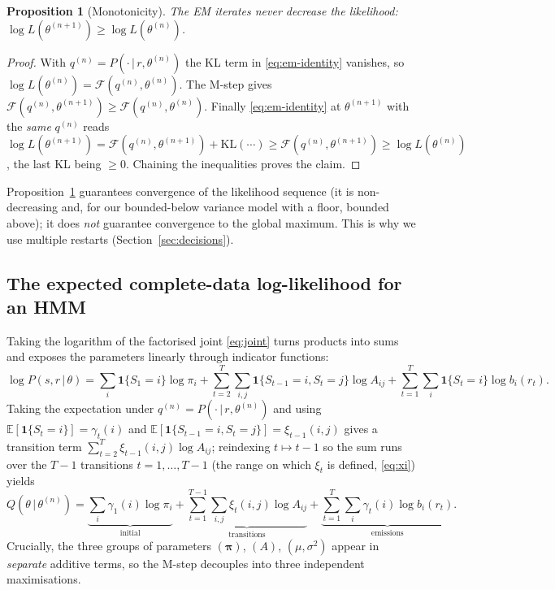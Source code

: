 \documentclass[11pt]{article}
\newcommand{\E}{\mathbb{E}}
\newcommand{\KL}{\mathrm{KL}}
\newcommand{\ind}{\mathbf{1}}                %
\newcommand{\given}{\,\vert\,}
\newcommand{\state}{S}
\newcommand{\obs}{r}
\theoremstyle{plain}
\newtheorem{proposition}{Proposition}
\theoremstyle{definition}
\theoremstyle{remark}
\begin{document}
\begin{proposition}[Monotonicity]\label{prop:monotone}
The EM iterates never decrease the likelihood:
$\log L(\theta^{(n+1)})\ge \log L(\theta^{(n)})$.
\end{proposition}

\begin{proof}
With $q^{(n)}=P(\cdot\given r,\theta^{(n)})$ the KL term in
\eqref{eq:em-identity} vanishes, so
$\log L(\theta^{(n)})=\mathcal F(q^{(n)},\theta^{(n)})$. The M-step gives
$\mathcal F(q^{(n)},\theta^{(n+1)})\ge \mathcal F(q^{(n)},\theta^{(n)})$. Finally
\eqref{eq:em-identity} at $\theta^{(n+1)}$ with the \emph{same} $q^{(n)}$ reads
$\log L(\theta^{(n+1)})=\mathcal F(q^{(n)},\theta^{(n+1)})+\KL(\cdots)\ge
\mathcal F(q^{(n)},\theta^{(n+1)})\ge \log L(\theta^{(n)})$, the last KL being
$\ge 0$. Chaining the inequalities proves the claim.
\end{proof}

Proposition~\ref{prop:monotone} guarantees convergence of the likelihood
sequence (it is non-decreasing and, for our bounded-below variance model with a
floor, bounded above); it does \emph{not} guarantee convergence to the global
maximum. This is why we use multiple restarts (Section~\ref{sec:decisions}).

\subsection{The expected complete-data log-likelihood for an HMM}

Taking the logarithm of the factorised joint \eqref{eq:joint} turns products
into sums and exposes the parameters linearly through indicator functions:
\begin{equation}
  \log P(s,r\given\theta)
  = \sum_{i}\ind\{\state_1=i\}\log\pi_i
  + \sum_{t=2}^{T}\sum_{i,j}\ind\{\state_{t-1}=i,\state_t=j\}\log A_{ij}
  + \sum_{t=1}^{T}\sum_{i}\ind\{\state_t=i\}\log b_i(\obs_t).
\end{equation}
Taking the expectation under $q^{(n)}=P(\cdot\given r,\theta^{(n)})$ and using
$\E[\ind\{\state_t=i\}]=\gamma_t(i)$ and
$\E[\ind\{\state_{t-1}=i,\state_t=j\}]=\xi_{t-1}(i,j)$ gives a transition term
$\sum_{t=2}^{T}\xi_{t-1}(i,j)\log A_{ij}$; reindexing $t\mapsto t-1$ so the sum
runs over the $T-1$ transitions $t=1,\dots,T-1$ (the range on which $\xi_t$ is
defined, \eqref{eq:xi}) yields
\begin{equation}\label{eq:Q-hmm}
  Q(\theta\given\theta^{(n)})
  = \underbrace{\sum_{i}\gamma_1(i)\log\pi_i}_{\text{initial}}
  + \underbrace{\sum_{t=1}^{T-1}\sum_{i,j}\xi_t(i,j)\log A_{ij}}_{\text{transitions}}
  + \underbrace{\sum_{t=1}^{T}\sum_{i}\gamma_t(i)\log b_i(\obs_t)}_{\text{emissions}} .
\end{equation}
Crucially, the three groups of parameters $(\bm\pi)$, $(A)$, $(\mu,\sigma^2)$
appear in \emph{separate} additive terms, so the M-step decouples into three
independent maximisations.
\end{document}
